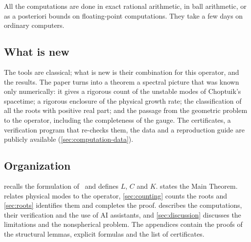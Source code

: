 All the computations are done in exact rational arithmetic, in ball arithmetic, or as a posteriori bounds on
floating-point computations. They take a few days on ordinary computers.

\subsection{What is new}

The tools are classical; what is new is their combination for this operator, and the results. The paper turns into a
theorem a spectral picture that was known only numerically: it gives a rigorous count of the unstable modes of
Choptuik's spacetime; a rigorous enclosure of the
physical growth rate; the classification of all the roots with positive real part; and the passage from the geometric
problem to the operator, including the completeness of the gauge. The certificates, a verification program that
re-checks them, the data and a reproduction guide are publicly available (\cref{sec:computation-data}).

\subsection{Organization}

 recalls the formulation of~\cite{RT2019} and defines $L$, $C$ and $K$.  states the
Main Theorem.  relates physical modes to the operator, \cref{sec:counting} counts the roots and
\cref{sec:roots} identifies them and completes the proof.  describes the computations, their
verification and the use of AI assistants, and \cref{sec:discussion} discusses the limitations and the nonspherical
problem. The appendices contain the proofs of the structural lemmas, explicit formulas and the list of certificates.
